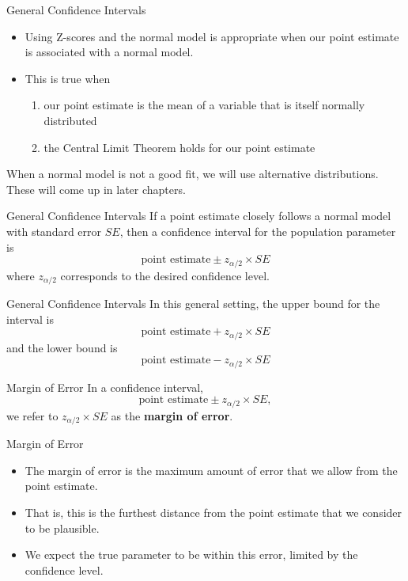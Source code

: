 \begin{frame}{General Confidence Intervals}
    \begin{itemize}
        \item Using Z-scores and the normal model is appropriate when our point estimate is associated with a normal model. 
        \item This is true when 
        \begin{enumerate}
            \item our point estimate is the mean of a variable that is itself normally distributed
            \item the Central Limit Theorem holds for our point estimate
        \end{enumerate}
    \end{itemize}
    When a normal model is not a good fit, we will use alternative distributions. These will come up in later chapters.
\end{frame}

\begin{frame}{General Confidence Intervals}
    If a point estimate closely follows a normal model with standard error $SE$, then a confidence interval for the population parameter is
    \[
        \text{point estimate} \pm z_{\alpha/2} \times SE
    \]
    where $z_{\alpha/2}$ corresponds to the desired confidence level.
\end{frame}

\begin{frame}{General Confidence Intervals}
    In this general setting, the upper bound for the interval is
    \[
        \text{point estimate} + z_{\alpha/2} \times SE
    \]
    and the lower bound is
    \[
        \text{point estimate} - z_{\alpha/2} \times SE
    \]
\end{frame}

\begin{frame}{Margin of Error}
    In a confidence interval, 
    \[
        \text{point estimate} \pm z_{\alpha/2} \times SE,
    \]
    we refer to $z_{\alpha/2} \times SE$ as the \textbf{margin of error}.
\end{frame}

\begin{frame}{Margin of Error}
    \begin{itemize}
        \item The margin of error is the maximum amount of error that we allow from the point estimate.
        \item That is, this is the furthest distance from the point estimate that we consider to be plausible.
        \item We expect the true parameter to be within this error, limited by the confidence level.
    \end{itemize}
\end{frame}

